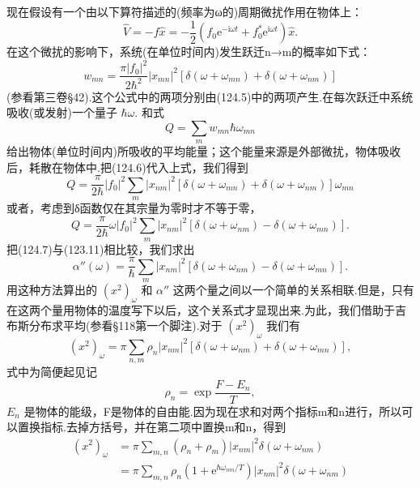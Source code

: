 现在假设有一个由以下算符描述的(频率为ω的)周期微扰作用在物体上：
\begin{equation}
  \hat{V}=-f\hat{x}=-\frac{1}{2}\left(f_0\mathrm{e}^{-\mathrm{i}\omega t}
  +f_0^*\mathrm{e}^{\mathrm{i}\omega t}\right)\hat{x}.
\end{equation}
在这个微扰的影响下，系统(在单位时间内)发生跃迁n→m的概率如下式：
\begin{equation}
  w_{mn}=\frac{\pi|f_0|^2}{2\hbar^2}|x_{mn}|^2
  \left[\delta(\omega+\omega_{mn})+\delta(\omega+\omega_{nm})\right]
\end{equation}
(参看第三卷§42).这个公式中的两项分别由(124.5)中的两项产生.在每次跃迁中系统吸收(或发射)一个量子 $\hbar\omega$. 和式
\begin{equation*}
  Q=\sum_m w_{mn}\hbar\omega_{mn}
\end{equation*}
给出物体(单位时间内)所吸收的平均能量；这个能量来源是外部微扰，物体吸收后，耗散在物体中.把(124.6)代入上式，我们得到
\begin{equation*}
  Q=\frac{\pi}{2\hbar}|f_0|^2\sum_m|x_{nm}|^2
  \left[\delta(\omega+\omega_{mn})+\delta(\omega+\omega_{nm})\right]\omega_{mn}
\end{equation*}
或者，考虑到δ函数仅在其宗量为零时才不等于零，
\begin{equation}
  Q=\frac{\pi}{2\hbar}\omega|f_0|^2\sum_m|x_{nm}|^2
  \left[\delta(\omega+\omega_{nm})-\delta(\omega+\omega_{mn})\right].
\end{equation}
把(124.7)与(123.11)相比较，我们求出
\begin{equation}
  \alpha''(\omega)=\frac{\pi}{\hbar}\sum_m|x_{nm}|^2
  \left[\delta(\omega+\omega_{nm})-\delta(\omega+\omega_{mn})\right].
\end{equation}
用这种方法算出的 $(x^2)_\omega$ 和 $\alpha''$ 这两个量之间以一个简单的关系相联.但是，只有在这两个量用物体的温度写下以后，这个关系式才显现出来.为此，我们借助于吉布斯分布求平均(参看§118第一个脚注).对于 $(x^2)_\omega$ 我们有
\begin{equation*}
  (x^2)_\omega=\pi\sum_{n,m}\rho_n|x_{nm}|^2
  \left[\delta(\omega+\omega_{nm})+\delta(\omega+\omega_{mn})\right],
\end{equation*}
式中为简便起见记
\begin{equation*}
  \rho_n=\exp\frac{F-E_n}{T},
\end{equation*}
$E_n$ 是物体的能级，F是物体的自由能.因为现在求和对两个指标m和n进行，所以可以置换指标.去掉方括号，并在第二项中置换m和n，得到
\begin{equation*}
\begin{aligned}
  (x^2)_\omega&=\pi\sum_{m,n}(\rho_n+\rho_m)|x_{nm}|^2\delta(\omega+\omega_{nm})\\
  &=\pi\sum_{m,n}\rho_n(1+\mathrm{e}^{\hbar\omega_{nm}/T})|x_{nm}|^2
  \delta(\omega+\omega_{nm})
\end{aligned}
\end{equation*}
